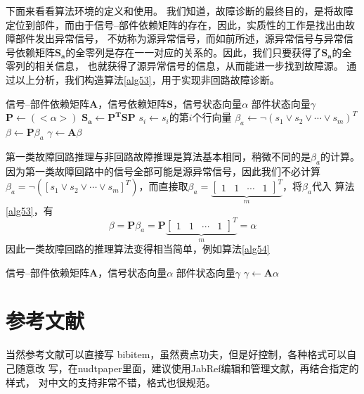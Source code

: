 下面来看看算法环境的定义和使用。
我们知道，故障诊断的最终目的，是将故障定位到部件，而由于信号--部件依赖矩阵的存在，因此，实质性的工作是找出由故障部件发出异常信号，
不妨称为源异常信号，而如前所述，源异常信号与异常信号依赖矩阵$\mathbf{S_a}$的全零列是存在一一对应的关系的。因此，我们只要获得了$\mathbf{S_a}$的全零列的相关信息，
也就获得了源异常信号的信息，从而能进一步找到故障源。
通过以上分析，我们构造算法\ref{alg53}，用于实现非回路故障诊断。
\begin{algorithm}[htbp]
  \caption{非回路故障诊断算法}
  \label{alg53}
  \begin{algorithmic}[1]
    \REQUIRE 信号--部件依赖矩阵$\mathbf{A}$，信号依赖矩阵$\mathbf{S}$，信号状态向量$\alpha$
    \ENSURE 部件状态向量$\gamma$
    \STATE $\mathbf{P}\leftarrow\left(<\alpha>\right)$
    \STATE $\mathbf{S_{a}}\leftarrow\mathbf{P^T}\mathbf{S}\mathbf{P}$
    \STATE $s_i\leftarrow s_i$的第$i$个行向量
    \ENDFOR
    \STATE $\beta_a\leftarrow\lnot \left(s_1\lor s_2\lor \cdots\lor s_m\right)^T$
    \STATE $\beta\leftarrow\mathbf{P}\beta_a$
    \STATE $\gamma\leftarrow\mathbf{A}\beta$
  \end{algorithmic}
\end{algorithm}

第一类故障回路推理与非回路故障推理是算法基本相同，稍微不同的是$\beta_a$的计算。因为第一类故障回路中的信号全部可能是源异常信号，因此我们不必计算
$\beta_a=\lnot \left(\left[s_1\lor s_2\lor \cdots\lor s_m\right]^T\right)$，而直接取$\beta_a=\underbrace{\left[\begin{array}{cccc}1&1&\cdots&1\end{array}\right]^T}_m$，将$\beta_a$代入
算法\ref{alg53}，有
\[\beta=\mathbf{P}\beta_a=\mathbf{P}\underbrace{\left[\begin{array}{cccc}1&1&\cdots&1\end{array}\right]^T}_m=\alpha\]
因此一类故障回路的推理算法变得相当简单，例如算法\ref{alg54}
\begin{algorithm}[htbp]
  \caption{第一类故障回路诊断算法}
  \label{alg54}
  \begin{algorithmic}[1]
    \REQUIRE 信号--部件依赖矩阵$\mathbf{A}$，信号状态向量$\alpha$
    \ENSURE 部件状态向量$\gamma$
    \STATE $\gamma\leftarrow\mathbf{A}\alpha$
  \end{algorithmic}
\end{algorithm}

\section{参考文献}
\label{sec:bib}
当然参考文献可以直接写 bibitem，虽然费点功夫，但是好控制，各种格式可以自己随意改
写，在nudtpaper里面，建议使用JabRef编辑和管理文献，再结合指定的样式，
对中文的支持非常不错，格式也很规范。

